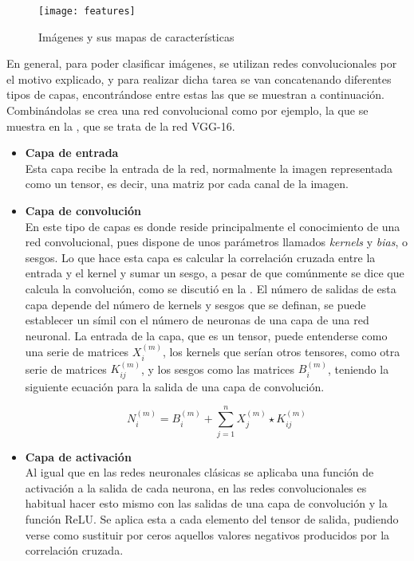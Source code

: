 			\begin{figure}[!h]
				\centering
				\texttt{[image: features]}
				\caption{Imágenes y sus mapas de características\cite{features}}
				\label{fig:features}
			\end{figure}
			
			En general, para poder clasificar imágenes, se utilizan redes convolucionales por el motivo explicado, y para realizar dicha tarea se van concatenando diferentes tipos de capas, encontrándose entre estas las que se muestran a continuación\cite{introCNN}. Combinándolas se crea una red convolucional como por ejemplo, la que se muestra en la , que se trata de la red VGG-16. 
			
			\begin{itemize}
				\item \textbf{Capa de entrada}\\
				Esta capa recibe la entrada de la red, normalmente la imagen representada como un tensor, es decir, una matriz por cada canal de la imagen. 
				
				\item \textbf{Capa de convolución}\\
				En este tipo de capas es donde reside principalmente el conocimiento de una red convolucional, pues dispone de unos parámetros llamados \textit{kernels} y \textit{bias}, o sesgos. Lo que hace esta capa es calcular la correlación cruzada entre la entrada y el kernel y sumar un sesgo, a pesar de que comúnmente se dice que calcula la convolución, como se discutió en la . El número de salidas de esta capa depende del número de kernels y sesgos que se definan, se puede establecer un símil con el número de neuronas de una capa de una red neuronal. La entrada de la capa, que es un tensor, puede entenderse como una serie de matrices $X_i^{(m)}$, los kernels que serían otros tensores, como otra serie de matrices $K_{ij}^{(m)}$, y los sesgos como las matrices $B_i^{(m)}$, teniendo la siguiente ecuación para la salida de una capa de convolución. 
				
				$$
				N_i^{(m)} = B_i^{(m)} + \sum_{j = 1}^n X_j^{(m)} \star K_{ij}^{(m)}
				$$
				
				\item \textbf{Capa de activación}\\
				Al igual que en las redes neuronales clásicas se aplicaba una función de activación a la salida de cada neurona, en las redes convolucionales es habitual hacer esto mismo con las salidas de una capa de convolución y la función ReLU. Se aplica esta a cada elemento del tensor de salida, pudiendo verse como sustituir por ceros aquellos valores negativos producidos por la correlación cruzada. 
				

\end{itemize}
